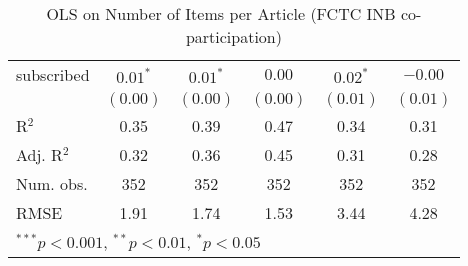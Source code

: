 \begin{table}[!h]
\begin{center}
\begin{tabular}{l c c c c c }
subscribed              & $0.01^{*}$   & $0.01^{*}$   & $0.00$       & $0.02^{*}$   & $-0.00$      \\
                        & $(0.00)$     & $(0.00)$     & $(0.00)$     & $(0.01)$     & $(0.01)$     \\
\midrule
R$^2$                   & 0.35         & 0.39         & 0.47         & 0.34         & 0.31         \\
Adj. R$^2$              & 0.32         & 0.36         & 0.45         & 0.31         & 0.28         \\
Num. obs.               & 352          & 352          & 352          & 352          & 352          \\
RMSE                    & 1.91         & 1.74         & 1.53         & 3.44         & 4.28         \\
\bottomrule
\multicolumn{6}{l}{\scriptsize{$^{***}p<0.001$, $^{**}p<0.01$, $^*p<0.05$}}
\end{tabular}
\caption{OLS on Number of Items per Article (FCTC INB co-participation)}
\label{table:coefficients}
\end{center}
\end{table}

